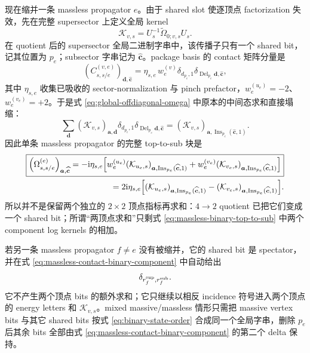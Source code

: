 \documentclass[11pt,a4paper]{ctexart}
\newcommand{\ii}{\mathrm i}
\begin{document}
现在缩并一条 massless propagator $e$。由于 shared slot 使逐顶点 factorization 失效，先在完整 supersector 上定义全局 kernel
\begin{equation}
 \mathcal K_{v,s}=U_s^{-1}\widetilde\Omega_{0;v,s}U_s.
 \label{eq:global-component-log-kernel}
\end{equation}
在 quotient 后的 supersector 全局二进制字串中，该传播子只有一个 shared bit，记其位置为 $p_e$；subsector 字串记为 $\widehat{\bm c}$。package basis 的 contact 矩阵分量是
\begin{equation}
 \left(C_{s,s/e}^{(v,e)}\right)_{\bm d,\widehat{\bm c}}
 =\eta_{s,e}\,w_e^{(v)}
 \delta_{d_{p_e},1}
 \delta_{\operatorname{Del}_{p_e}\bm d,\widehat{\bm c}},
 \label{eq:massless-contact-binary-component}
\end{equation}
其中 $\eta_{s,e}$ 收集已吸收的 sector-normalization 与 pinch prefactor，$w_e^{(u_e)}=-2$、$w_e^{(v_e)}=+2$。于是式 \eqref{eq:global-offdiagonal-omega} 中原本的中间态求和直接塌缩：
\begin{equation}
 \sum_{\bm d}
 (\mathcal K_{v,s})_{\bm a,\bm d}
 \delta_{d_{p_e},1}
 \delta_{\operatorname{Del}_{p_e}\bm d,\widehat{\bm c}}
 =
 (\mathcal K_{v,s})_{\bm a,
 \operatorname{Ins}_{p_e}(\widehat{\bm c},1)}.
 \label{eq:massless-binary-sum-collapse}
\end{equation}
因此单条 massless propagator 的完整 top-to-sub 块是
\begin{align}
 \boxed{
 \left(\Omega_{s,s/e}^{(e)}\right)_{\bm a,\widehat{\bm c}}
 =-\ii\eta_{s,e}\Big[
 w_e^{(u_e)}(\mathcal K_{u_e,s})_{\bm a,\operatorname{Ins}_{p_e}(\widehat{\bm c},1)}
 +w_e^{(v_e)}(\mathcal K_{v_e,s})_{\bm a,\operatorname{Ins}_{p_e}(\widehat{\bm c},1)}
 \Big]
 }
 \notag\\
 =2\ii\eta_{s,e}\Big[
 (\mathcal K_{u_e,s})_{\bm a,\operatorname{Ins}_{p_e}(\widehat{\bm c},1)}
 -(\mathcal K_{v_e,s})_{\bm a,\operatorname{Ins}_{p_e}(\widehat{\bm c},1)}
 \Big].
 \label{eq:massless-binary-top-to-sub}
\end{align}
所以并不是保留两个独立的 $2\times2$ 顶点指标再求和：$4\to2$ quotient 已把它们变成一个 shared bit；所谓“两顶点求和”只剩式 \eqref{eq:massless-binary-top-to-sub} 中两个 component log kernels 的相加。

若另一条 massless propagator $f\neq e$ 没有被缩并，它的 shared bit 是 spectator，并在式 \eqref{eq:massless-contact-binary-component} 中自动给出
\begin{equation}
 \delta_{r_f^{\rm sup},r_f^{\rm sub}}.
 \label{eq:massless-spectator-delta}
\end{equation}
它不产生两个顶点 bits 的额外求和；它只继续以相反 incidence 符号进入两个顶点的 energy letters 和 $\mathcal K_{v,s}$。mixed massive/massless 情形只需把 massive vertex bits 与其它 shared bits 按式 \eqref{eq:binary-state-order} 合成同一个全局字串，删除 $p_e$ 后其余 bits 全部由式 \eqref{eq:massless-contact-binary-component} 的第二个 delta 保持。
\end{document}
